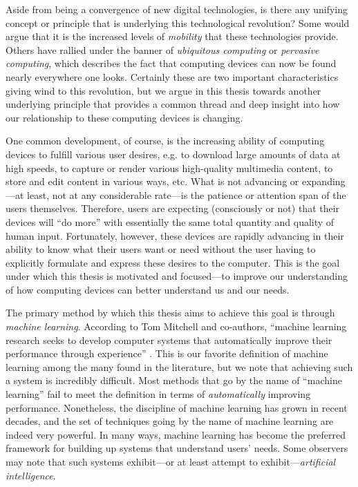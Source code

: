 Aside from being a convergence of new digital technologies, is there any unifying concept or principle that is underlying this technological revolution? Some would argue that it is the increased levels of \emph{mobility} that these technologies provide. Others have rallied under the banner of \emph{ubiquitous computing} or \emph{pervasive computing}, which describes the fact that computing devices can now be found nearly everywhere one looks. Certainly these are two important characteristics giving wind to this revolution, but we argue in this thesis towards another underlying principle that provides a common thread and deep insight into how our relationship to these computing devices is changing.

One common development, of course, is the increasing ability of computing devices to fulfill various user desires, e.g. to download large amounts of data at high speeds, to capture or render various high-quality multimedia content, to store and edit content in various ways, etc. What is not advancing or expanding---at least, not at any considerable rate---is the patience or attention span of the users themselves. Therefore, users are expecting (consciously or not) that their devices will ``do more'' with essentially the same total quantity and quality of human input. Fortunately, however, these devices are rapidly advancing in their ability to know what their users want or need without the user having to explicitly formulate and express these desires to the computer. This is the goal under which this thesis is motivated and focused---to improve our understanding of how computing devices can better understand us and our needs.

The primary method by which this thesis aims to achieve this goal is through \emph{machine learning}. According to Tom Mitchell and co-authors, ``machine learning research seeks to develop computer systems that automatically improve their performance through experience'' \cite{Mitchell1990}. This is our favorite definition of machine learning among the many found in the literature, but we note that achieving such a system is incredibly difficult. Most methods that go by the name of ``machine learning'' fail to meet the definition in terms of \emph{automatically} improving performance. Nonetheless, the discipline of machine learning has grown in recent decades, and the set of techniques going by the name of machine learning are indeed very powerful. In many ways, machine learning has become the preferred framework for building up systems that understand users' needs. Some observers may note that such systems exhibit---or at least attempt to exhibit---\emph{artificial intelligence}.

